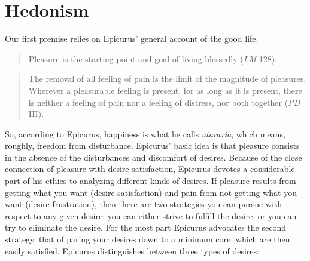 \documentclass[11pt]{article}
\begin{document}
\section*{Hedonism}
Our first  premise relies on Epicurus' general account of the good life. 

\begin{quote}
Pleasure is the starting point and goal of living blessedly (\emph{LM} 128).\end{quote}

\begin{quote}
 The removal of all feeling of pain is the limit of the magnitude of pleasures. Wherever a pleasurable feeling is present, for as long as it is present, there is neither a feeling of pain nor a feeling of distress, nor both together (\emph{PD} III).\end{quote}
So, according to Epicurus, happiness is what he calls \emph{ataraxia}, which means, roughly, freedom from disturbance. Epicurus' basic idea is that pleasure consists in the absence of the disturbances and discomfort of desires. Because of the close connection of pleasure with desire-satisfaction, Epicurus devotes a considerable part of his ethics to analyzing
different kinds of desires. If pleasure results from getting what you
want (desire-satisfaction) and pain from not getting what you want
(desire-frustration), then there are two strategies you can pursue with
respect to any given desire: you can either strive to fulfill the
desire, or you can try to eliminate the desire. For the most part
Epicurus advocates the second strategy, that of paring your desires down
to a minimum core, which are then easily satisfied. Epicurus distinguishes between three types of desires:

 


\end{document}
